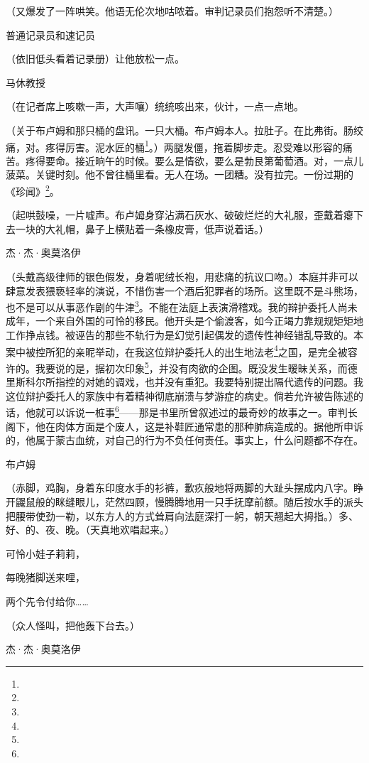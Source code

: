 \par （又爆发了一阵哄笑。他语无伦次地咕哝着。审判记录员们抱怨听不清楚。）
\par 普通记录员和速记员
\par （依旧低头看着记录册）让他放松一点。
\par 马休教授
\par （在记者席上咳嗽一声，大声嚷）统统咳出来，伙计，一点一点地。
\par （关于布卢姆和那只桶的盘讯。一只大桶。布卢姆本人。拉肚子。在比弗街。肠绞痛，对。疼得厉害。泥水匠的桶\footnote{}。）两腿发僵，拖着脚步走。忍受难以形容的痛苦。疼得要命。接近晌午的时候。要么是情欲，要么是勃艮第葡萄酒。对，一点儿菠菜。关键时刻。他不曾往桶里看。无人在场。一团糟。没有拉完。一份过期的《珍闻》\footnote{}。
\par （起哄鼓噪，一片嘘声。布卢姆身穿沾满石灰水、破破烂烂的大礼服，歪戴着瘪下去一块的大礼帽，鼻子上横贴着一条橡皮膏，低声说着话。）
\par 杰·杰·奥莫洛伊
\par （头戴高级律师的银色假发，身着呢绒长袍，用悲痛的抗议口吻。）本庭并非可以肆意发表猥亵轻率的演说，不惜伤害一个酒后犯罪者的场所。这里既不是斗熊场，也不是可以从事恶作剧的牛津\footnote{}。不能在法庭上表演滑稽戏。我的辩护委托人尚未成年，一个来自外国的可怜的移民。他开头是个偷渡客，如今正竭力靠规规矩矩地工作挣点钱。被诬告的那些不轨行为是幻觉引起偶发的遗传性神经错乱导致的。本案中被控所犯的亲昵举动，在我这位辩护委托人的出生地法老\footnote{}之国，是完全被容许的。我要说的是，据初次印象\footnote{}，并没有肉欲的企图。既没发生暧昧关系，而德里斯科尔所指控的对她的调戏，也并没有重犯。我要特别提出隔代遗传的问题。我这位辩护委托人的家族中有着精神彻底崩溃与梦游症的病史。倘若允许被告陈述的话，他就可以诉说一桩事\footnote{}——那是书里所曾叙述过的最奇妙的故事之一。审判长阁下，他在肉体方面是个废人，这是补鞋匠通常患的那种肺病造成的。据他所申诉的，他属于蒙古血统，对自己的行为不负任何责任。事实上，什么问题都不存在。
\par 布卢姆
\par （赤脚，鸡胸，身着东印度水手的衫裤，歉疚般地将两脚的大趾头摆成内八字。睁开鼹鼠般的眯缝眼儿，茫然四顾，慢腾腾地用一只手抚摩前额。随后按水手的派头把腰带使劲一勒，以东方人的方式耸肩向法庭深打一躬，朝天翘起大拇指。）多、好、的、夜、晚。（天真地欢唱起来。）
\par 可怜小娃子莉莉，
\par 每晚猪脚送来哩，
\par 两个先令付给你……
\par （众人怪叫，把他轰下台去。）
\par 杰·杰·奥莫洛伊
